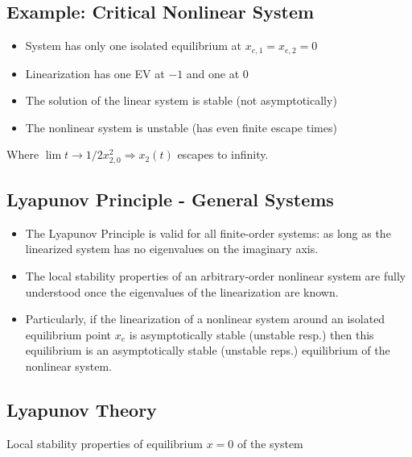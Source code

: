 \documentclass[10pt,a4paper]{scrartcl}
\begin{document}
\begin{multicols*}{3}

\subsection{Example: Critical Nonlinear System}


\begin{itemize}
\ncompaq
\item System has only one isolated equilibrium at $x_{e,1}=x_{e,2}=0$
\item Linearization has one EV at $-1$ and one at $0$
\item The solution of the linear system is stable (not asymptotically)
\item The nonlinear system is unstable (has even finite escape times)
\end{itemize}


Where $\lim t\rightarrow 1/2x_{2,0}^2\Rightarrow x_2(t)$ \dahe escapes to infinity.

\subsection{Lyapunov Principle - General Systems}

\begin{itemize}
\ncompaq
\item The Lyapunov Principle is valid for all finite-order systems: as long as the linearized system has no eigenvalues on the imaginary axis.
\item The local stability properties of an arbitrary-order nonlinear system are fully understood once the eigenvalues of the linearization are known.
\item Particularly, if the linearization of a nonlinear system around an isolated equilibrium point $x_e$ is asymptotically stable (unstable resp.) then this equilibrium is an asymptotically stable (unstable reps.) equilibrium of the nonlinear system.
\end{itemize}

\subsection{Lyapunov Theory}

Local stability properties of equilibrium $x=0$ of the system


\end{multicols*}
\end{document}

